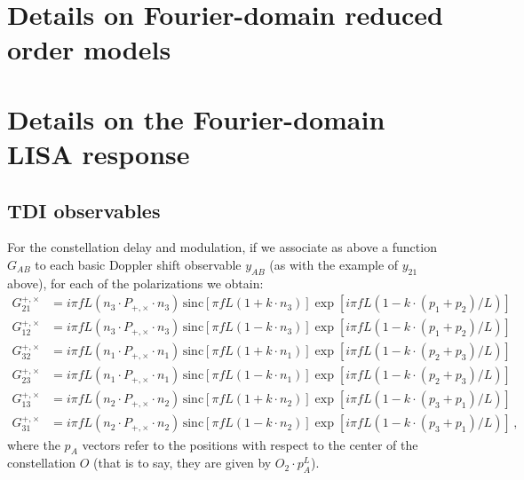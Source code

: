 \documentclass[aps,showpacs,%
prd,superscriptaddress,nofootinbib]{revtex4}
\newcommand{\nn}{\nonumber}
\newcommand{\sinc}{\,\mathrm{sinc}}
\begin{document}
\appendix

\section{Details on Fourier-domain reduced order models}
\label{app:rom}


\section{Details on the Fourier-domain LISA response}
\label{app:fdresponse}


\subsection{TDI observables}
\label{appsubsec:TDI}

For the constellation delay and modulation, if we associate as above a function $G_{AB}$ to each basic Doppler shift observable $y_{AB}$ (as with the example of $y_{21}$ above), for each of the polarizations we obtain:
%
\begin{align}
	G_{21}^{+,\times} &= i\pi f L \left(n_{3}\cdot P_{+,\times}\cdot n_{3}\right) \sinc\left[ \pi f L \left( 1 + k\cdot n_{3} \right) \right] \exp\left[ i\pi f L \left( 1 - k\cdot (p_{1}+p_{2})/L  \right) \right] \nn\\
	G_{12}^{+,\times} &= i\pi f L \left(n_{3}\cdot P_{+,\times}\cdot n_{3}\right) \sinc\left[ \pi f L \left( 1 - k\cdot n_{3} \right) \right] \exp\left[ i\pi f L \left( 1 - k\cdot (p_{1}+p_{2})/L  \right) \right] \nn\\
	G_{32}^{+,\times} &= i\pi f L \left(n_{1}\cdot P_{+,\times}\cdot n_{1}\right) \sinc\left[ \pi f L \left( 1 + k\cdot n_{1} \right) \right] \exp\left[ i\pi f L \left( 1 - k\cdot (p_{2}+p_{3})/L  \right) \right] \nn\\
	G_{23}^{+,\times} &= i\pi f L \left(n_{1}\cdot P_{+,\times}\cdot n_{1}\right) \sinc\left[ \pi f L \left( 1 - k\cdot n_{1} \right) \right] \exp\left[ i\pi f L \left( 1 - k\cdot (p_{2}+p_{3})/L  \right) \right] \nn\\
	G_{13}^{+,\times} &= i\pi f L \left(n_{2}\cdot P_{+,\times}\cdot n_{2}\right) \sinc\left[ \pi f L \left( 1 + k\cdot n_{2} \right) \right] \exp\left[ i\pi f L \left( 1 - k\cdot (p_{3}+p_{1})/L  \right) \right] \nn\\
	G_{31}^{+,\times} &= i\pi f L \left(n_{2}\cdot P_{+,\times}\cdot n_{2}\right) \sinc\left[ \pi f L \left( 1 - k\cdot n_{2} \right) \right] \exp\left[ i\pi f L \left( 1 - k\cdot (p_{3}+p_{1})/L  \right) \right] \,,
\end{align}
%
where the $p_{A}$ vectors refer to the positions with respect to the center of the constellation $O$ (that is to say, they are given by $O_{2}\cdot p_{A}^{L}$).
\end{document}
